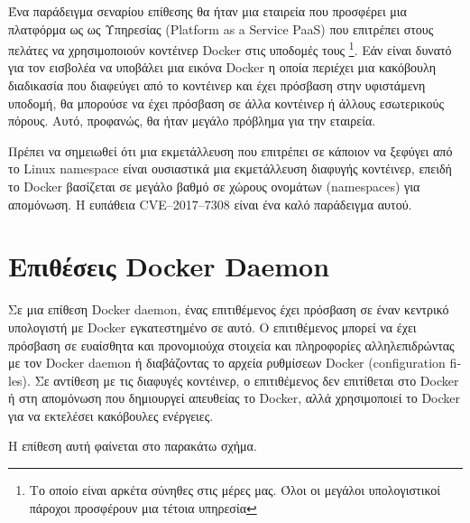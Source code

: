 Ένα παράδειγμα σεναρίου επίθεσης θα ήταν μια εταιρεία που προσφέρει μια πλατφόρμα ως
ως Υπηρεσίας (\textlatin{Platform as a Service PaaS}) που επιτρέπει στους
πελάτες να χρησιμοποιούν κοντέινερ Docker στις υποδομές τους
\footnote{Το οποίο είναι αρκέτα σύνηθες στις μέρες μας. Όλοι οι μεγάλοι
υπολογιστικοί πάροχοι προσφέρουν μια τέτοια υπηρεσία}.
Εάν είναι δυνατό για τον εισβολέα να υποβάλει μια εικόνα \textlatin{Docker}
η οποία περιέχει μια κακόβουλη διαδικασία που διαφεύγει από το κοντέινερ και
έχει πρόσβαση στην υφιστάμενη υποδομή, θα μπορούσε να έχει πρόσβαση σε άλλα
κοντέινερ ή άλλους εσωτερικούς πόρους. Αυτό, προφανώς, θα ήταν μεγάλο πρόβλημα
για την εταιρεία.

Πρέπει να σημειωθεί ότι μια εκμετάλλευση που επιτρέπει σε κάποιον να ξεφύγει
από το \textlatin{Linux namespace} είναι ουσιαστικά μια εκμετάλλευση
διαφυγής κοντέινερ, επειδή το \textlatin{Docker} βασίζεται σε μεγάλο βαθμό σε
χώρους ονομάτων (\textlatin{namespaces}) για απομόνωση.
Η ευπάθεια \textlatin{CVE–2017–7308} \cite{CVE-2017-7308} είναι ένα καλό
παράδειγμα αυτού.

\section{Επιθέσεις \textlatin{Docker Daemon}}

Σε μια επίθεση \textlatin{Docker daemon}, ένας επιτιθέμενος έχει πρόσβαση σε
έναν κεντρικό υπολογιστή με \textlatin{Docker} εγκατεστημένο σε αυτό. Ο
επιτιθέμενος μπορεί να έχει πρόσβαση σε ευαίσθητα και προνομιούχα στοιχεία και
πληροφορίες αλληλεπιδρώντας με τον \textlatin{Docker daemon} ή διαβάζοντας το
αρχεία ρυθμίσεων \textlatin{Docker (configuration files)}. Σε αντίθεση με
τις διαφυγές κοντέινερ, ο επιτιθέμενος δεν επιτίθεται στο \textlatin{Docker}
ή στη απομόνωση που δημιουργεί απευθείας το \textlatin{Docker}, αλλά
χρησιμοποιεί το \textlatin{Docker} για να εκτελέσει κακόβουλες ενέργειες.

Η επίθεση αυτή φαίνεται στο παρακάτω σχήμα.

